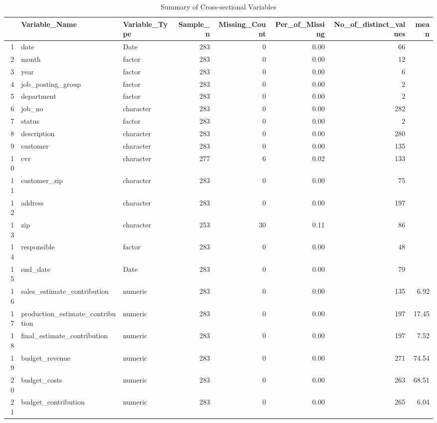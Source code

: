 \begin{sidewaystable}[ht]
\centering
\caption{Summary of Cross-sectional Variables} 
\begin{tabular}{rllrrrrr}
  \hline
 & Variable\_Name & Variable\_Type & Sample\_n & Missing\_Count & Per\_of\_Missing & No\_of\_distinct\_values & mean \\ 
  \hline
1 & date & Date & 283 &   0 & 0.00 &  66 &  \\ 
  2 & month & factor & 283 &   0 & 0.00 &  12 &  \\ 
  3 & year & factor & 283 &   0 & 0.00 &   6 &  \\ 
  4 & job\_posting\_group & factor & 283 &   0 & 0.00 &   2 &  \\ 
  5 & department & factor & 283 &   0 & 0.00 &   2 &  \\ 
  6 & job\_no & character & 283 &   0 & 0.00 & 282 &  \\ 
  7 & status & factor & 283 &   0 & 0.00 &   2 &  \\ 
  8 & description & character & 283 &   0 & 0.00 & 280 &  \\ 
  9 & customer & character & 283 &   0 & 0.00 & 135 &  \\ 
  10 & cvr & character & 277 &   6 & 0.02 & 133 &  \\ 
  11 & customer\_zip & character & 283 &   0 & 0.00 &  75 &  \\ 
  12 & address & character & 283 &   0 & 0.00 & 197 &  \\ 
  13 & zip & character & 253 &  30 & 0.11 &  86 &  \\ 
  14 & responsible & factor & 283 &   0 & 0.00 &  48 &  \\ 
  15 & end\_date & Date & 283 &   0 & 0.00 &  79 &  \\ 
  16 & sales\_estimate\_contribution & numeric & 283 &   0 & 0.00 & 135 & 6.92 \\ 
  17 & production\_estimate\_contribution & numeric & 283 &   0 & 0.00 & 197 & 17.45 \\ 
  18 & final\_estimate\_contribution & numeric & 283 &   0 & 0.00 & 197 & 7.52 \\ 
  19 & budget\_revenue & numeric & 283 &   0 & 0.00 & 271 & 74.54 \\ 
  20 & budget\_costs & numeric & 283 &   0 & 0.00 & 263 & 68.51 \\ 
  21 & budget\_contribution & numeric & 283 &   0 & 0.00 & 265 & 6.04 \\ 

\end{tabular}
\end{sidewaystable}
